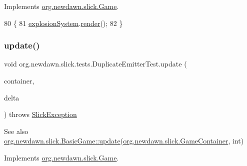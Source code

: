Implements \mbox{\hyperlink{interfaceorg_1_1newdawn_1_1slick_1_1_game_af1a4670d43eb3ba04dfcf55ab1975b64}{org.\+newdawn.\+slick.\+Game}}.


\begin{DoxyCode}
80                                                                                   \{
81         \mbox{\hyperlink{classorg_1_1newdawn_1_1slick_1_1tests_1_1_duplicate_emitter_test_ad51ae06362283e4a70164d3be38c3ae6}{explosionSystem}}.\mbox{\hyperlink{classorg_1_1newdawn_1_1slick_1_1particles_1_1_particle_system_a81fd0123e1b180410a33e80a052cbfac}{render}}();
82     \}
\end{DoxyCode}
\mbox{\label{classorg_1_1newdawn_1_1slick_1_1tests_1_1_duplicate_emitter_test_af62c2eca6105e5edad52e76a4a7f8e45}} 
\subsubsection{\texorpdfstring{update()}{update()}}
{\footnotesize\ttfamily void org.\+newdawn.\+slick.\+tests.\+Duplicate\+Emitter\+Test.\+update (\begin{DoxyParamCaption}\item[{\mbox{\hyperlink{classorg_1_1newdawn_1_1slick_1_1_game_container}{Game\+Container}}}]{container,  }\item[{int}]{delta }\end{DoxyParamCaption}) throws \mbox{\hyperlink{classorg_1_1newdawn_1_1slick_1_1_slick_exception}{Slick\+Exception}}\hspace{0.3cm}{\ttfamily [inline]}}

\begin{DoxySeeAlso}{See also}
\mbox{\hyperlink{classorg_1_1newdawn_1_1slick_1_1_basic_game_acfe6fa05aef83bff1631af91a3e4bd20}{org.\+newdawn.\+slick.\+Basic\+Game\+::update}}(\mbox{\hyperlink{classorg_1_1newdawn_1_1slick_1_1_game_container}{org.\+newdawn.\+slick.\+Game\+Container}}, int) 
\end{DoxySeeAlso}


Implements \mbox{\hyperlink{interfaceorg_1_1newdawn_1_1slick_1_1_game_ab07b2e9463ee4631620dde0de25bdee8}{org.\+newdawn.\+slick.\+Game}}.


